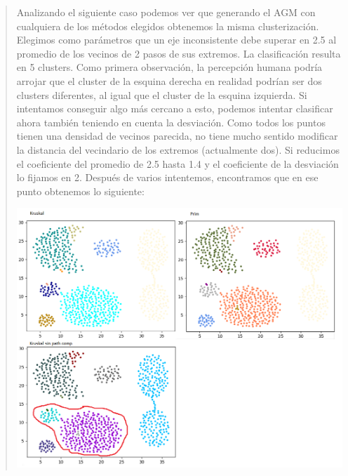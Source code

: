 \documentclass[12pt,a4paper]{article}
\begin{document}
\begin{verse}
Analizando el siguiente caso podemos ver que generando el AGM con cualquiera de los métodos elegidos obtenemos la misma clusterización. Elegimos como parámetros que un eje inconsistente debe superar en 2.5 al promedio de los vecinos de 2 pasos de sus extremos. La clasificación resulta en 5 clusters. Como primera observación, la percepción humana podría arrojar que el cluster de la esquina derecha en realidad podrían ser dos clusters diferentes, al igual que el cluster de la esquina izquierda. Si intentamos conseguir algo más cercano a esto, podemos intentar clasificar ahora también teniendo en cuenta la desviación. Como todos los puntos tienen una densidad de vecinos parecida, no tiene mucho sentido modificar la distancia del vecindario de los extremos (actualmente dos). Si reducimos el coeficiente del promedio de 2.5 hasta 1.4 y el coeficiente de la desviación lo fijamos en 2. Después de varios intentemos, encontramos que en ese punto obtenemos lo siguiente:


\begin{center}
\includegraphics[scale=.4]{graficos/aggregation2.png}
\end{center}
\end{verse}
\end{document}
